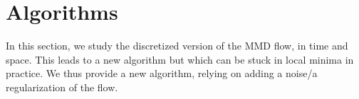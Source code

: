 \section{Algorithms}\label{sec:discretized_flow}

In this section, we study the discretized version of the MMD flow, in time and space. This leads to a new algorithm but which can be stuck in local minima in practice. We thus provide a new algorithm, relying on adding a noise/a regularization of the flow.%








